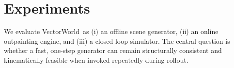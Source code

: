 \documentclass{article}
\newcommand{\VectorWorld}{VectorWorld}
\theoremstyle{plain}
\theoremstyle{definition}
\theoremstyle{remark}
\begin{document}
\section{Experiments}
\label{sec:exp}

We evaluate \VectorWorld\ as (i) an offline scene generator, (ii) an online outpainting engine, and (iii) a closed-loop simulator.
The central question is whether a fast, one-step generator can remain structurally consistent and kinematically feasible when invoked repeatedly during rollout.


    
    

    
\end{document}
